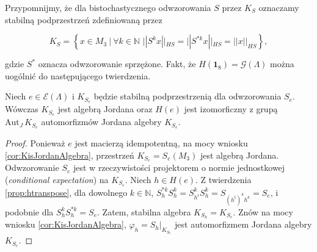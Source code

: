 {Przypomnijmy, że dla  bistochastycznego odwzorowania $S$
przez $K_{S}$ oznaczamy stabilną podprzestrzeń zdefiniowaną przez
\begin{linenomath*}
 \begin{equation}
    K_{S} = \left \{ x \in M_{3} \:|\:
            \forall k \in \mathbb{N} \,\,
            || S^{k} x ||_{HS} = || S^{*k} x ||_{HS} =  ||x||_{HS}
    \right \},
 \end{equation}
\end{linenomath*}
gdzie $S^{*}$ oznacza odwzorowanie sprzężone.
Fakt, że $H(\mathbf{1}_{8}) = \mathcal{G}(\Lambda)$
można uogólnić do następującego twierdzenia.
\begin{Theorem}
    Niech $e \in \mathcal{E}(\Lambda)$ i
    $K_{S_{e}}$ będzie stabilną podprzestrzenią dla odwzorowania $S_{e}$.
    Wówczas $K_{S_{e}}$ jest algebrą Jordana oraz
    $H(e)$ jest izomorficzny z grupą $\text{Aut}_{J} \, K_{S_{e}}$
    automorfizmów Jordana algebry $K_{S_{e}}$.
\end{Theorem}

\begin{proof}
Ponieważ $e$ jest macierzą idempotentną, na mocy
wniosku \ref{cor:KisJordanAlgebra},
przestrzeń $K_{S_{e}} = S_{e}(M_{3})$ jest algebrą Jordana.
Odwzorowanie $S_{e}$ jest w rzeczywistości
projektorem o normie jednostkowej (\emph{conditional expectation})
na $K_{S_{e}}$.
Niech $h \in H(e)$.
Z twierdzenia \ref{prop:htranspose}, dla dowolnego $k\in \mathbb{N}$,
$S_{h}^{* k} S_{h}^{k} = S_{h^{t}}^{k} S_{h}^{k} =  S_{(h^{t})^{k} h^{k}} = S_{e}$,
i podobnie dla $S_{h}^{k} S_{h}^{* k}= S_{e}$.
Zatem, stabilna algebra $K_{S_{h}} = K_{S_{e}}$.
Znów na mocy wniosku \ref{cor:KisJordanAlgebra},
$\varphi_{h} = S_{h} \big |_{K_{S_{e}}}$
jest automorfizmem Jordana algebry $K_{S_{e}}$.


\end{proof}}
